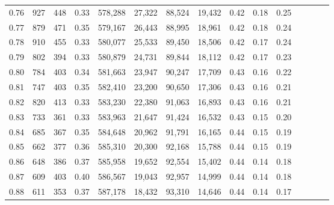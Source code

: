 \begin{tabular}{rrrcrrrrrrrrrrr}
0.76 &     927 &     448 &                                       0.33 &  578,288 &   27,322 &   88,524 &   19,432 &  0.42 &  0.18 &                         0.25 \\
0.77 &     879 &     471 &                                       0.35 &  579,167 &   26,443 &   88,995 &   18,961 &  0.42 &  0.18 &                         0.24 \\
0.78 &     910 &     455 &                                       0.33 &  580,077 &   25,533 &   89,450 &   18,506 &  0.42 &  0.17 &                         0.24 \\
0.79 &     802 &     394 &                                       0.33 &  580,879 &   24,731 &   89,844 &   18,112 &  0.42 &  0.17 &                         0.23 \\
0.80 &     784 &     403 &                                       0.34 &  581,663 &   23,947 &   90,247 &   17,709 &  0.43 &  0.16 &                         0.22 \\
0.81 &     747 &     403 &                                       0.35 &  582,410 &   23,200 &   90,650 &   17,306 &  0.43 &  0.16 &                         0.21 \\
0.82 &     820 &     413 &                                       0.33 &  583,230 &   22,380 &   91,063 &   16,893 &  0.43 &  0.16 &                         0.21 \\
0.83 &     733 &     361 &                                       0.33 &  583,963 &   21,647 &   91,424 &   16,532 &  0.43 &  0.15 &                         0.20 \\
0.84 &     685 &     367 &                                       0.35 &  584,648 &   20,962 &   91,791 &   16,165 &  0.44 &  0.15 &                         0.19 \\
0.85 &     662 &     377 &                                       0.36 &  585,310 &   20,300 &   92,168 &   15,788 &  0.44 &  0.15 &                         0.19 \\
0.86 &     648 &     386 &                                       0.37 &  585,958 &   19,652 &   92,554 &   15,402 &  0.44 &  0.14 &                         0.18 \\
0.87 &     609 &     403 &                                       0.40 &  586,567 &   19,043 &   92,957 &   14,999 &  0.44 &  0.14 &                         0.18 \\
0.88 &     611 &     353 &                                       0.37 &  587,178 &   18,432 &   93,310 &   14,646 &  0.44 &  0.14 &                         0.17 \\

\end{tabular}
